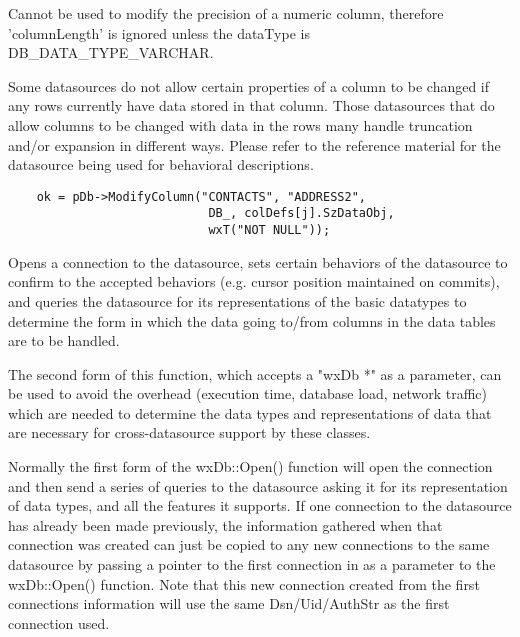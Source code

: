 
Cannot be used to modify the precision of a numeric column, therefore 'columnLength'
is ignored unless the dataType is DB\_DATA\_TYPE\_VARCHAR.

Some datasources do not allow certain properties of a column to be changed if any rows
currently have data stored in that column.  Those datasources that do allow columns
to be changed with data in the rows many handle truncation and/or expansion in
different ways.  Please refer to the reference material for the datasource being
used for behavioral descriptions.


\begin{verbatim}
    ok = pDb->ModifyColumn("CONTACTS", "ADDRESS2",
                            DB_, colDefs[j].SzDataObj,
                            wxT("NOT NULL"));
\end{verbatim}


\label{wxdbopen}





Opens a connection to the datasource, sets certain behaviors of the datasource
to confirm to the accepted behaviors (e.g. cursor position maintained on
commits), and queries the datasource for its representations of the basic
datatypes to determine the form in which the data going to/from columns in
the data tables are to be handled.

The second form of this function, which accepts a "wxDb *" as a parameter,
can be used to avoid the overhead (execution time, database load, network
traffic) which are needed to determine the data types and representations
of data that are necessary for cross-datasource support by these classes.

Normally the first form of the wxDb::Open() function will open the connection
and then send a series of queries to the datasource asking it for its
representation of data types, and all the features it supports.  If one
connection to the datasource has already been made previously, the information
gathered when that connection was created can just be copied to any new
connections to the same datasource by passing a pointer to the first
connection in as a parameter to the wxDb::Open() function.  Note that this
new connection created from the first connections information will use the
same Dsn/Uid/AuthStr as the first connection used.

